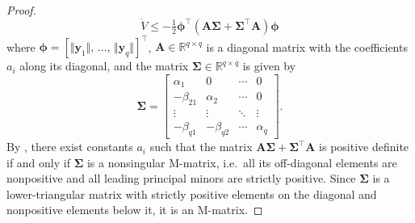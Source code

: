 \documentclass[../main.tex]{subfiles}
\begin{document}
\begin{proof}
    \begin{equation}\label{eq:comp:Vdot_bound}
        \dot{V} \leq -\tfrac{1}{2} \bm{\phi}^\top (\bm{A} \bm{\Sigma} + \bm{\Sigma}^\top \bm{A} ) \bm{\phi}
    \end{equation}
    where $\bm{\phi} = \left[ \Vert \bm{y}_1 \Vert,\, \ldots,\, \Vert \bm{y}_q \Vert   \right]^\top$, $\bm{A} \in \mathbb{R}^{q\times q}$ is a diagonal matrix with the coefficients $a_i$ along its diagonal, and the matrix $\bm{\Sigma}\in \mathbb{R}^{q\times q}$ is given by
    \begin{equation}\label{eq:comp:S}
        \bm{\Sigma} = \begin{bmatrix}
            \alpha_1 & 0 & \cdots & 0\\
            -\beta_{21} & \alpha_2 & \cdots & 0\\
            \vdots & \vdots & \ddots & \vdots\\
            -\beta_{q1} & -\beta_{q2} & \cdots & \alpha_q
            \end{bmatrix} .
    \end{equation}
    By \cite[Lemma 9.7]{Khalil}, there exist constants $a_i$ such that the matrix $\bm{A} \bm{\Sigma} + \bm{\Sigma}^\top \bm{A}$ is positive definite if and only if $\bm{\Sigma}$ is a nonsingular M-matrix, i.e.~all its off-diagonal elements are nonpositive and all leading principal minors are strictly positive. Since $\bm{\Sigma}$ is a lower-triangular matrix with strictly positive elements on the diagonal and nonpositive elements below it, it is an M-matrix.


\end{proof}
\end{document}
